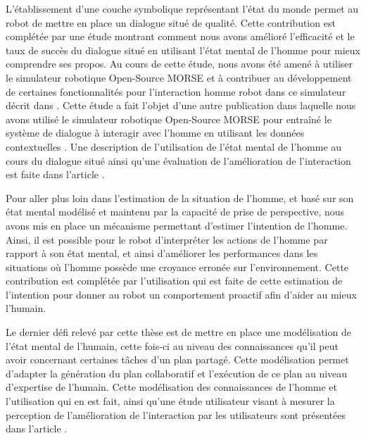 \documentclass[a4paper,11pt,twoside]{StyleThese}
\begin{document}
L'établissement d'une couche symbolique représentant l'état du monde permet au robot de mettre en place un dialogue situé de qualité. Cette contribution est complétée par une étude montrant comment nous avons amélioré l'efficacité et le taux de succès du dialogue situé en utilisant l'état mental de l'homme pour mieux comprendre ses propos. Au cours de cette étude, nous avons été amené à utiliser le simulateur robotique Open-Source MORSE et à contribuer au développement de certaines fonctionnalités pour l'interaction homme robot dans ce simulateur décrit dans \cite{simparmorse2014}. Cette étude a fait l'objet d'une autre publication dans laquelle nous avons utilisé le simulateur robotique Open-Source MORSE pour entraîné le système de dialogue à interagir avec l'homme en utilisant les données contextuelles \cite{simpar_2014}. Une description de l'utilisation de l'état mental de l'homme au cours du dialogue situé ainsi qu'une évaluation de l'amélioration de l'interaction est faite dans l'article \cite{Ferreira2015}.


Pour aller plus loin dans l'estimation de la situation de l'homme, et basé sur son état mental modélisé et maintenu par la capacité de prise de perspective, nous avons mis en place un mécanisme permettant d'estimer l'intention de l'homme. Ainsi, il est possible pour le robot d'interpréter les actions de l'homme par rapport à son état mental, et ainsi d'améliorer les performances dans les situations où l'homme possède une croyance erronée sur l'environnement. Cette contribution est complétée par l'utilisation qui est faite de cette estimation de l'intention pour donner au robot un comportement proactif afin d'aider au mieux l'humain. 

Le dernier défi relevé par cette thèse est de mettre en place une modélisation de l'état mental de l'humain, cette fois-ci au niveau des connaissances qu'il peut avoir concernant certaines tâches d'un plan partagé. Cette modélisation permet d'adapter la génération du plan collaboratif et l'exécution de ce plan au niveau d'expertise de l'humain. Cette modélisation des connaissances de l'homme et l'utilisation qui en est fait, ainsi qu'une étude utilisateur visant à mesurer la perception de l'amélioration de l'interaction par les utilisateurs sont présentées dans l'article \cite{Milliez16}.

\end{document}
